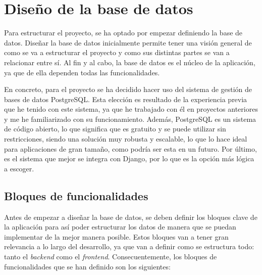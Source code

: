 \section{Diseño de la base de datos}
\label{dev:sec:diseno_base_datos}

Para estructurar el proyecto, se ha optado por empezar definiendo la base de datos. Diseñar la base de datos inicialmente permite tener una visión general de como se va a estructurar el proyecto y como sus distintas partes se van a relacionar entre sí. Al fin y al cabo, la base de datos es el núcleo de la aplicación, ya que de ella dependen todas las funcionalidades.

En concreto, para el proyecto se ha decidido hacer uso del sistema de gestión de bases de datos PostgreSQL. Esta elección es resultado de la experiencia previa que he tenido con este sistema, ya que he trabajado con él en proyectos anteriores y me he familiarizado con su funcionamiento. Además, PostgreSQL es un sistema de código abierto, lo que significa que es gratuito y se puede utilizar sin restricciones, siendo una solución muy robusta y escalable, lo que lo hace ideal para aplicaciones de gran tamaño, como podría ser esta en un futuro. Por último, es el sistema que mejor se integra con Django, por lo que es la opción más lógica a escoger.

\subsection{Bloques de funcionalidades}
\label{dev:subsec:bloques_funcionalidades}

Antes de empezar a diseñar la base de datos, se deben definir los bloques clave de la aplicación para así poder estructurar los datos de manera que se puedan implementar de la mejor manera posible. Estos bloques van a tener gran relevancia a lo largo del desarrollo, ya que van a definir como se estructura todo: tanto el \textit{backend} como el \textit{frontend}. Consecuentemente, los bloques de funcionalidades que se han definido son los siguientes:

